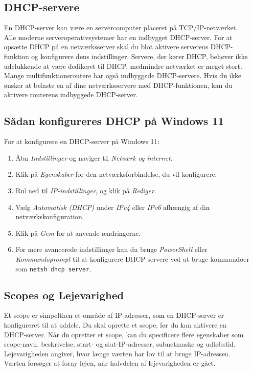 \subsection{DHCP-servere}
En DHCP-server kan være en servercomputer placeret på TCP/IP-netværket. Alle moderne serveroperativsystemer har en indbygget DHCP-server. For at opsætte DHCP på en netværksserver skal du blot aktivere serverens DHCP-funktion og konfigurere dens indstillinger. Servere, der kører DHCP, behøver ikke udelukkende at være dedikeret til DHCP, medmindre netværket er meget stort.
\newline
\newline
\noindent Mange multifunktionsroutere har også indbyggede DHCP-servere. Hvis du ikke ønsker at belaste en af dine netværksservere med DHCP-funktionen, kan du aktivere routerens indbyggede DHCP-server.

\subsection{Sådan konfigureres DHCP på Windows 11}
For at konfigurere en DHCP-server på Windows 11:
\begin{enumerate}
	\item Åbn \textit{Indstillinger} og naviger til \textit{Netværk og internet}.
	\item Klik på \textit{Egenskaber} for den netværksforbindelse, du vil konfigurere.
	\item Rul ned til \textit{IP-indstillinger}, og klik på \textit{Rediger}.
	\item Vælg \textit{Automatisk (DHCP)} under \textit{IPv4} eller \textit{IPv6} afhængig af din netværkskonfiguration.
	\item Klik på \textit{Gem} for at anvende ændringerne.
	\item For mere avancerede indstillinger kan du bruge \textit{PowerShell} eller \textit{Kommandoprompt} til at konfigurere DHCP-servere ved at bruge kommandoer som \texttt{netsh dhcp server}.
\end{enumerate}

\subsection{Scopes og Lejevarighed}
Et scope er simpelthen et område af IP-adresser, som en DHCP-server er konfigureret til at uddele. Du skal oprette et scope, før du kan aktivere en DHCP-server. Når du opretter et scope, kan du specificere flere egenskaber som scope-navn, beskrivelse, start- og slut-IP-adresser, subnetmaske og udløbstid. Lejevarigheden angiver, hvor længe værten har lov til at bruge IP-adressen. Værten forsøger at forny lejen, når halvdelen af lejevarigheden er gået.


